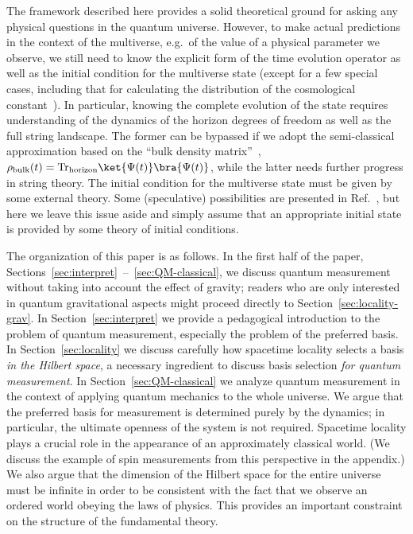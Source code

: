 \documentclass[12pt]{article}
\begin{document}
The framework described here provides a solid theoretical ground for 
asking any physical questions in the quantum universe.  However, to 
make actual predictions in the context of the multiverse, e.g.\ of the 
value of a physical parameter we observe, we still need to know the 
explicit form of the time evolution operator as well as the initial 
condition for the multiverse state (except for a few special cases, 
including that for calculating the distribution of the cosmological 
constant~\cite{Larsen:2011mi}).  In particular, knowing the complete 
evolution of the state requires understanding of the dynamics of the 
horizon degrees of freedom as well as the full string landscape.  The 
former can be bypassed if we adopt the semi-classical approximation based 
on the ``bulk density matrix''~\cite{Nomura:2011dt}, $\rho_{\rm bulk}(t) 
= {\rm Tr}_{\rm horizon} \ket{\Psi(t)} \bra{\Psi(t)}$, while the latter 
needs further progress in string theory.  The initial condition for 
the multiverse state must be given by some external theory.  Some 
(speculative) possibilities are presented in Ref.~\cite{Nomura:2011dt}, 
but here we leave this issue aside and simply assume that an appropriate 
initial state is provided by some theory of initial conditions.

The organization of this paper is as follows.  In the first half of 
the paper, Sections~\ref{sec:interpret}~--~\ref{sec:QM-classical}, 
we discuss quantum measurement without taking into account the effect 
of gravity; readers who are only interested in quantum gravitational 
aspects might proceed directly to Section~\ref{sec:locality-grav}.  In 
Section~\ref{sec:interpret} we provide a pedagogical introduction to the 
problem of quantum measurement, especially the problem of the preferred 
basis.  In Section~\ref{sec:locality} we discuss carefully how spacetime 
locality selects a basis {\it in the Hilbert space}, a necessary 
ingredient to discuss basis selection {\it for quantum measurement}. 
In Section~\ref{sec:QM-classical} we analyze quantum measurement 
in the context of applying quantum mechanics to the whole universe. 
We argue that the preferred basis for measurement is determined purely 
by the dynamics; in particular, the ultimate openness of the system is 
not required.  Spacetime locality plays a crucial role in the appearance 
of an approximately classical world.  (We discuss the example of spin 
measurements from this perspective in the appendix.)  We also argue 
that the dimension of the Hilbert space for the entire universe must 
be infinite in order to be consistent with the fact that we observe an 
ordered world obeying the laws of physics.  This provides an important 
constraint on the structure of the fundamental theory.
\end{document}
